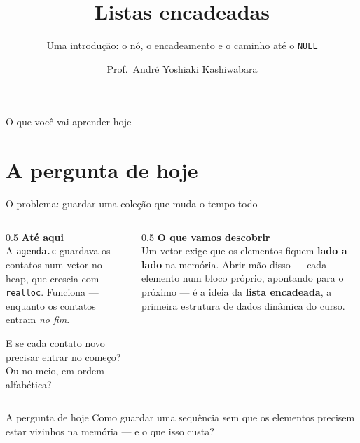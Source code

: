 \documentclass[aspectratio=169]{beamer}
\title{Listas encadeadas}
\subtitle{Uma introdução: o nó, o encadeamento e o caminho até o \texttt{NULL}}
\author{Prof.\ André Yoshiaki Kashiwabara}
\institute{DCOMP -- Universidade Federal de Sergipe\\
\texttt{andreyoshiaki@dcomp.ufs.br}}
\date{}
\begin{document}
\begin{frame}[plain]
  \titlepage
\end{frame}

\begin{frame}{O que você vai aprender hoje}
  \begin{center}
  \end{center}
\end{frame}

\section{A pergunta de hoje}

\begin{frame}{O problema: guardar uma coleção que muda o tempo todo}
  \begin{columns}[T]
    \begin{column}{0.5\textwidth}
      \textbf{Até aqui}\\[0.3em]
      \small
      A \texttt{agenda.c} guardava os contatos num vetor no heap, que
      crescia com \texttt{realloc}. Funciona --- enquanto os contatos
      entram \emph{no fim}.

      \medskip
      E se cada contato novo precisar entrar \textcolor{UFSRed}{no
      começo}? Ou no meio, em ordem alfabética?
    \end{column}
    \begin{column}{0.5\textwidth}
      \textbf{O que vamos descobrir}\\[0.3em]
      \small
      Um vetor exige que os elementos fiquem \textbf{lado a lado} na
      memória. Abrir mão disso --- cada elemento num bloco próprio,
      apontando para o próximo --- é a ideia da \textbf{lista
      encadeada}, a primeira estrutura de dados dinâmica do curso.
    \end{column}
  \end{columns}
  \begin{block}{A pergunta de hoje}
    Como guardar uma sequência sem que os elementos precisem estar
    vizinhos na memória --- e o que isso custa?
  \end{block}
\end{frame}
\end{document}

